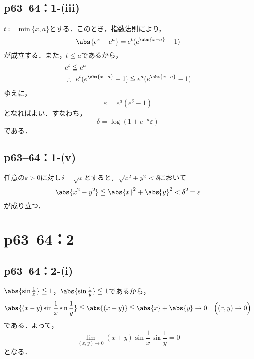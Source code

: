 \documentclass[a4paper,10pt,fleqn]{ltjsarticle}
\begin{document}
\subsection*{p63--64：1-(iii)}


\begin{tleftbar}
    $t \coloneqq \min \{x,a\}$とする．このとき，指数法則により，
    \[
        \abs{e^x-e^a}=e^t (e^{\abs{x-a}}-1)
    \]
    が成立する．また，$t \le a$であるから，
    \begin{align*}
         & e^t \le e^a                                                \\
         & \therefore ~ e^t(e^{\abs{x-a}}-1) \le e^a(e^{\abs{x-a}}-1)
    \end{align*}
    ゆえに，
    \[
        \varepsilon = e^a (e^\delta -1)
    \]
    となればよい．すなわち，
    \[
        \delta = \log (1+e^{-a}\varepsilon)
    \]
    である．
\end{tleftbar}


\subsection*{p63--64：1-(v)}


\begin{leftbar}
    任意の$\varepsilon > 0$に対し$\delta = \sqrt{\varepsilon}$とすると，$\sqrt{x^2 + y^2} < \delta$において
    \[
        \abs{x^2-y^2} \leq \abs{x}^2 + \abs{y}^2 < \delta^2 = \varepsilon
    \]
    が成り立つ．
\end{leftbar}



\section*{p63--64：2}


\subsection*{p63--64：2-(i)}

\begin{tleftbar}
    $\abs{\sin \frac{1}{x}} \le 1$，$\abs{\sin \frac{1}{y}} \le 1$であるから，
    \[
        \abs{(x+y) \sin \frac{1}{x} \sin \frac{1}{y}} \le \abs{(x+y)} \le \abs{x}+\abs{y} \to 0 \quad  \Bigl( (x,y) \to 0 \Bigl)
    \]
    である．よって，
    \[
        \lim_{(x,y)\to 0} (x+y) \sin \frac{1}{x} \sin \frac{1}{y} =0
    \]
    となる．
\end{tleftbar}
\end{document}
